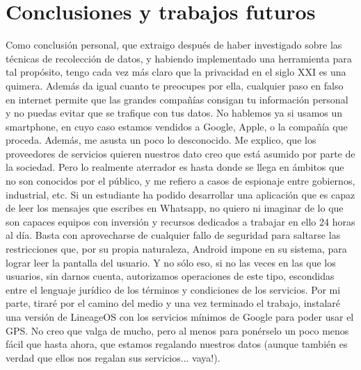 \documentclass[12pt,a4paper,oneside]{book} %
\begin{document}
\chapter{Conclusiones y trabajos futuros}
Como conclusión personal, que extraigo después de haber investigado sobre las técnicas de recolección de datos, y habiendo implementado una herramienta para tal propósito, tengo cada vez más claro que la privacidad en el siglo XXI es una quimera. Además da igual cuanto te preocupes por ella, cualquier paso en falso en internet permite que las grandes compañías consigan tu información personal y no puedas evitar que se trafique con tus datos. No hablemos ya si usamos un smartphone, en cuyo caso estamos vendidos a Google, Apple, o la compañía que proceda. 
\newline \newline 
Además, me asusta un poco lo desconocido. Me explico, que los proveedores de servicios quieren nuestros dato creo que está asumido por parte de la sociedad. Pero lo realmente aterrador es hasta donde se llega en ámbitos que no son conocidos por el público, y me refiero a casos de espionaje entre gobiernos, industrial, etc. 
\newline \newline 
Si un estudiante ha podido desarrollar una aplicación que es capaz de leer los mensajes que escribes en Whatsapp, no quiero ni imaginar de lo que son capaces equipos con inversión y recursos dedicados a trabajar en ello 24 horas al día. Basta con aprovecharse de cualquier fallo de seguridad para saltarse las restricciones que, por su propia naturaleza, Android impone en su sistema, para lograr leer la pantalla del usuario. Y no sólo eso, si no las veces en las que los usuarios, sin darnos cuenta, autorizamos operaciones de este tipo, escondidas entre el lenguaje jurídico de los términos y condiciones de los servicios. 
\newline \newline 
Por mi parte, tiraré por el camino del medio y una vez terminado el trabajo, instalaré una versión de LineageOS con los servicios mínimos de Google para poder usar el GPS. No creo que valga de mucho, pero al menos para ponérselo un poco menos fácil que hasta ahora, que estamos regalando nuestros datos (aunque también es verdad que ellos nos regalan sus servicios... vaya!). 
\end{document}
